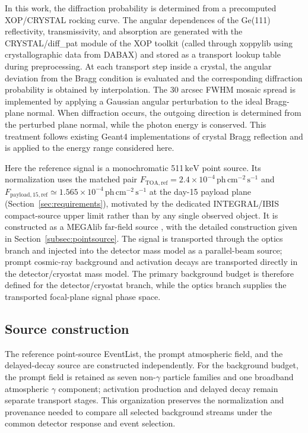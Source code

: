 \documentclass[11pt]{article}
\newcommand{\keV}{\ensuremath{\,\mathrm{keV}}}
\newcommand{\phcms}{\ensuremath{\,\mathrm{ph\,cm^{-2}\,s^{-1}}}}
\newcommand{\ftoaref}{F_{\mathrm{TOA,ref}}}
\newcommand{\fpayloadref}{F_{\mathrm{payload,15,ref}}}
\begin{document}
In this work, the diffraction probability is determined from a precomputed XOP/CRYSTAL rocking curve. The angular dependences of the Ge(111) reflectivity, transmissivity, and absorption are generated with the CRYSTAL/diff\_pat module of the XOP toolkit (called through xoppylib using crystallographic data from DABAX) \cite{SanchezDelRio2011XOP} and stored as a transport lookup table during preprocessing. At each transport step inside a crystal, the angular deviation from the Bragg condition is evaluated and the corresponding diffraction probability is obtained by interpolation. The 30 arcsec FWHM mosaic spread is implemented by applying a Gaussian angular perturbation to the ideal Bragg-plane normal. When diffraction occurs, the outgoing direction is determined from the perturbed plane normal, while the photon energy is conserved. This treatment follows existing Geant4 implementations of crystal Bragg reflection \cite{Guan2023BraggReflection,Reiazi2025G4BraggReflection} and is applied to the energy range considered here.

Here the reference signal is a monochromatic 511\keV{} point source. Its
normalization uses the matched pair $\ftoaref=2.4\times10^{-4}\phcms$ and
$\fpayloadref\simeq1.565\times10^{-4}\phcms$ at the day-15 payload plane
(Section~\ref{sec:requirements}), motivated by the dedicated INTEGRAL/IBIS
compact-source upper limit \cite{DeCesare2011} rather than by any single
observed object. It is constructed as a MEGAlib far-field source
\cite{Zoglauer2006}, with the detailed construction given in
Section~\ref{subsec:pointsource}. The signal is transported through the optics
branch and injected into the detector mass model as a parallel-beam source;
prompt cosmic-ray background and activation decays are transported directly in
the detector/cryostat mass model. The primary background budget is therefore
defined for the detector/cryostat branch, while the optics branch supplies the
transported focal-plane signal phase space.

\subsection{Source construction}
\label{sec:background}

The reference point-source EventList, the prompt atmospheric field, and the
delayed-decay source are constructed independently. For the background budget,
the prompt field is retained as seven non-$\gamma$ particle families and one
broadband atmospheric $\gamma$ component; activation production and delayed
decay remain separate transport stages. This organization preserves the
normalization and provenance needed to compare all selected background streams
under the common detector response and event selection.
\end{document}
